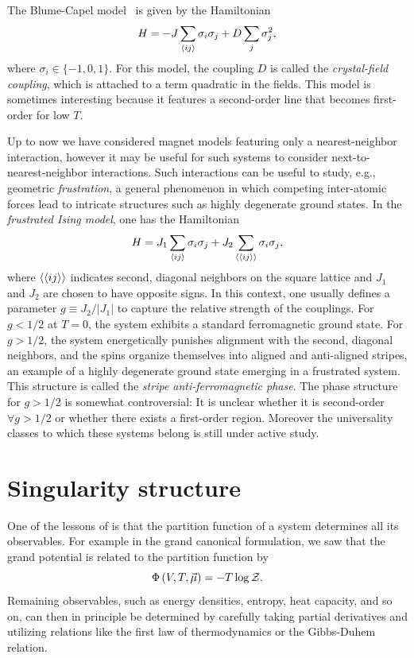 The Blume-Capel 
model~\cite{blume_theory_1966,capel_possibility_1966} is given
by the Hamiltonian
\begin{equation}\label{eq:blume-capel}
H=-J\sum_{\ev{i j}} \sigma_i \sigma_j+D \sum_j\sigma_j^2,
\end{equation}
where $\sigma_i\in\{-1,0,1\}$. For this model, the coupling $D$ is called
the {\it crystal-field coupling}, which is attached to a term quadratic in the
fields. This model is sometimes interesting because it features a second-order
line that becomes first-order for low $T$.

Up to now we have considered magnet models featuring only a nearest-neighbor
interaction, however it may be useful for such systems to consider
next-to-nearest-neighbor interactions. Such interactions can be useful to study,
e.g., geometric {\it frustration}, a general phenomenon in
which competing inter-atomic forces lead to intricate structures such as
highly degenerate ground states. In the  {\it frustrated Ising model}, one has the Hamiltonian
\begin{equation}
H=J_1\sum_{\ev{i j}} \sigma_i \sigma_j + J_2\sum_{\ev{\ev{i j}}} \sigma_i \sigma_j,
\end{equation}
where $\ev{\ev{ij}}$ indicates second, diagonal neighbors on the square lattice
and $J_1$ and $J_2$ are chosen to have opposite signs. In this context, one
usually defines a parameter $g\equiv J_2/|J_1|$ to capture the relative strength
of the couplings. For $g<1/2$ at $T=0$, the system exhibits a standard
ferromagnetic ground state. For $g>1/2$, the system energetically punishes
alignment with the second, diagonal neighbors, and the spins organize themselves
into aligned and anti-aligned stripes, an example of a highly degenerate ground
state emerging in a frustrated system. This structure is called the
{\it stripe anti-ferromagnetic phase}.
The phase structure for $g>1/2$ is somewhat controversial: It is
unclear whether it is second-order $\forall g>1/2$ or whether there exists a
first-order region. Moreover the universality classes to which these systems
belong is still under active study.


\section{Singularity structure}\label{sec:leeyang}

One of the lessons of  is that the partition function of a
system determines all its observables. For example in the grand canonical
formulation, we saw that the grand potential is related to the partition
function by
\begin{equation}\label{eq:grandPotZ}
  \Phi\left(V,T,\vec{\mu}\right)=-T\log\mathcal{Z}.
\end{equation}
Remaining observables, such as energy densities, entropy, heat capacity, and so
on, can then in principle be determined by carefully taking partial derivatives
and utilizing relations like the first law of thermodynamics or the Gibbs-Duhem
relation.


